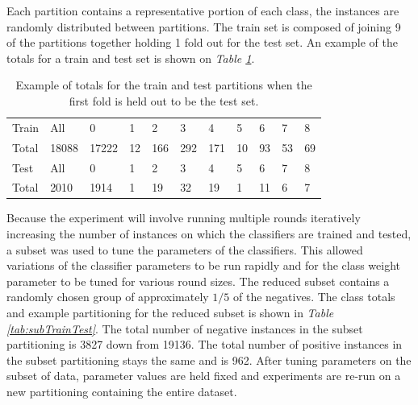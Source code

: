 \documentclass[ms]{nuthesis}
\begin{document}
\par Each partition contains a representative portion of each class, the instances are randomly
distributed between partitions. The train set is composed of joining 9 of the partitions together
holding 1 fold out for the test set. An example of the totals for a train and test set
is shown on \textit{Table \ref{tab:TrainTest}}.

\FloatBarrier
\begin{table}[H]
  \centering
  \caption{Example of totals for the train and test partitions when the first fold is
  held out to be the test set.}
  \label{tab:TrainTest}
  \begin{tabular}{|l||l||l||l||l||l||l||l||l||l||l|}\toprule
    Train & All & 0 & 1 & 2 & 3 & 4 & 5 & 6 & 7 & 8 \\
    Total & 18088 & 17222 & 12 & 166 & 292 & 171 & 10 & 93 & 53 & 69 \\ \midrule
    Test & All &  0 & 1 & 2 & 3 & 4 & 5 & 6 & 7 & 8 \\
    Total & 2010 & 1914 & 1 & 19 & 32 & 19 & 1 & 11 & 6 & 7 \\
 \bottomrule
  \end{tabular}
\end{table}
\FloatBarrier

\par Because the experiment will involve running multiple rounds iteratively increasing the
number of instances on which the classifiers are trained and tested, a subset was used to
tune the parameters of the classifiers. This allowed variations of the classifier parameters to be
run rapidly and for the class weight parameter to be tuned for various round sizes. The reduced subset
contains a randomly chosen group of approximately $1/5$ of the negatives. The class totals and example
partitioning for the reduced subset is shown in \textit{Table \ref{tab:subTrainTest}}. The total number
of negative instances in the subset partitioning is 3827 down from 19136. The total number of
positive instances in the subset partitioning stays the same and is 962.
After tuning parameters on the subset of data, parameter values are held fixed and experiments
are re-run on a new partitioning containing the entire dataset.
\end{document}
